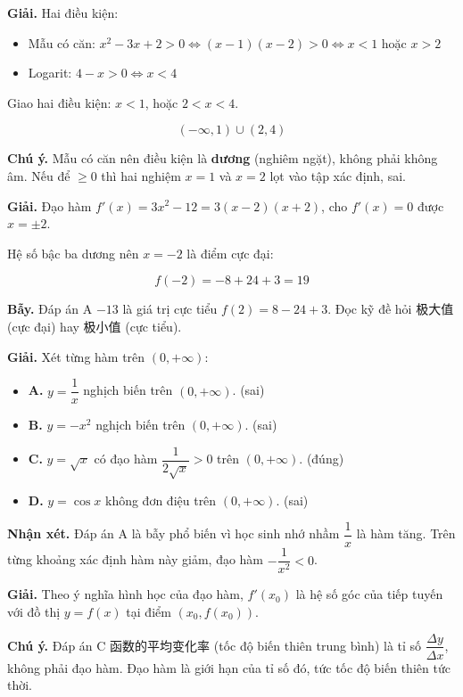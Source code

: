 \documentclass[11pt, a4paper]{article}
\begin{document}
\begin{dapan}[6 — Đáp án A]
\textbf{Giải.} Hai điều kiện:

\begin{itemize}[leftmargin=1.4em, itemsep=2pt]
\item Mẫu có căn: $x^2 - 3x + 2 > 0 \iff (x-1)(x-2) > 0 \iff x < 1$ hoặc $x > 2$
\item Logarit: $4 - x > 0 \iff x < 4$
\end{itemize}


Giao hai điều kiện: $x < 1$, hoặc $2 < x < 4$.

$$(-\infty, 1) \cup (2, 4)$$

\textbf{Chú ý.} Mẫu có căn nên điều kiện là \textbf{dương} (nghiêm ngặt), không phải không âm. Nếu để $\ge 0$ thì hai nghiệm $x = 1$ và $x = 2$ lọt vào tập xác định, sai.
\end{dapan}

\begin{dapan}[7 — Đáp án D]
\textbf{Giải.} Đạo hàm $f'(x) = 3x^2 - 12 = 3(x-2)(x+2)$, cho $f'(x) = 0$ được $x = \pm 2$.

Hệ số bậc ba dương nên $x = -2$ là điểm cực đại:

$$f(-2) = -8 + 24 + 3 = 19$$

\textbf{Bẫy.} Đáp án A $-13$ là giá trị cực tiểu $f(2) = 8 - 24 + 3$. Đọc kỹ đề hỏi 极大值 (cực đại) hay 极小值 (cực tiểu).
\end{dapan}

\begin{dapan}[8 — Đáp án C]
\textbf{Giải.} Xét từng hàm trên $(0, +\infty)$:

\begin{itemize}[leftmargin=1.4em, itemsep=2pt]
\item \textbf{A.} $y = \dfrac{1}{x}$ nghịch biến trên $(0, +\infty)$. (sai)
\item \textbf{B.} $y = -x^2$ nghịch biến trên $(0, +\infty)$. (sai)
\item \textbf{C.} $y = \sqrt{x}$ có đạo hàm $\dfrac{1}{2\sqrt{x}} > 0$ trên $(0, +\infty)$. (đúng)
\item \textbf{D.} $y = \cos x$ không đơn điệu trên $(0, +\infty)$. (sai)
\end{itemize}


\textbf{Nhận xét.} Đáp án A là bẫy phổ biến vì học sinh nhớ nhầm $\dfrac{1}{x}$ là hàm tăng. Trên từng khoảng xác định hàm này giảm, đạo hàm $-\dfrac{1}{x^2} < 0$.
\end{dapan}

\begin{dapan}[9 — Đáp án B]
\textbf{Giải.} Theo ý nghĩa hình học của đạo hàm, $f'(x_0)$ là hệ số góc của tiếp tuyến với đồ thị $y = f(x)$ tại điểm $(x_0, f(x_0))$.

\textbf{Chú ý.} Đáp án C 函数的平均变化率 (tốc độ biến thiên trung bình) là tỉ số $\dfrac{\Delta y}{\Delta x}$, không phải đạo hàm. Đạo hàm là giới hạn của tỉ số đó, tức tốc độ biến thiên tức thời.
\end{dapan}
\end{document}
